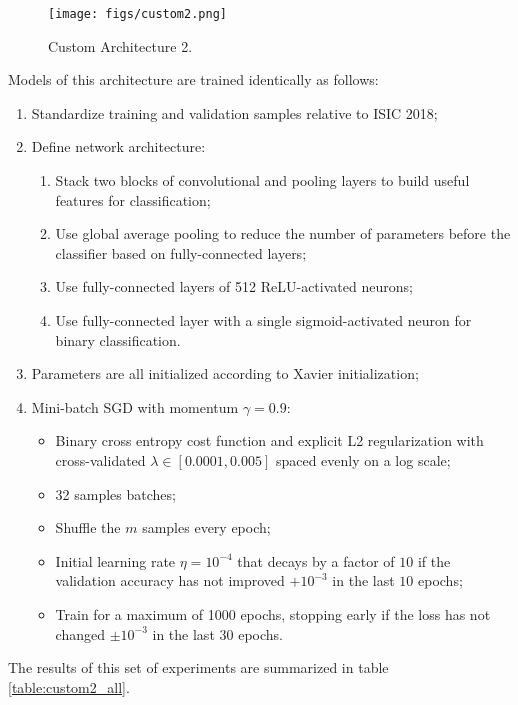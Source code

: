 \begin{figure}[ht]
    \centering
    \texttt{[image: figs/custom2.png]}
    \caption{Custom Architecture 2.}
    \label{fig:custom2}
\end{figure}

Models of this architecture are trained identically as follows:

\begin{enumerate}
    \item Standardize training and validation samples relative to \ac{ISIC} 2018;
    \item Define network architecture:
        \begin{enumerate}
            \item Stack two blocks of convolutional and pooling layers to build useful features for classification;
            \item Use global average pooling to reduce the number of parameters before the classifier based on fully-connected layers;
            \item Use fully-connected layers of 512 ReLU-activated neurons;
            \item Use fully-connected layer with a single sigmoid-activated neuron for binary classification.
        \end{enumerate}
    \item Parameters are all initialized according to Xavier initialization;
    \item Mini-batch \ac{SGD} with momentum $\gamma = 0.9$:
        \begin{itemize}
            \item Binary cross entropy cost function and explicit L2 regularization with cross-validated $\lambda \in [0.0001, 0.005]$ spaced evenly on a log scale;
            \item 32 samples batches;
            \item Shuffle the $m$ samples every epoch;
            \item Initial learning rate $\eta = 10^{-4}$ that decays by a factor of $10$ if the validation accuracy has not improved $+10^{-3}$ in the last $10$ epochs;
            \item Train for a maximum of 1000 epochs, stopping early if the loss has not changed $\pm 10^{-3}$ in the last $30$ epochs.
        \end{itemize}
\end{enumerate}

The results of this set of experiments are summarized in table \ref{table:custom2_all}.

